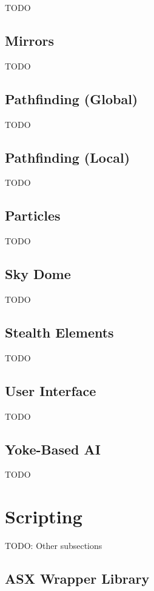 TODO

\subsection{Mirrors}

TODO

\subsection{Pathfinding (Global)}

TODO

\subsection{Pathfinding (Local)}

TODO

\subsection{Particles}

TODO

\subsection{Sky Dome}

TODO

\subsection{Stealth Elements}

TODO

\subsection{User Interface}

TODO

\subsection{Yoke-Based AI}

TODO

\section{Scripting}

TODO: Other subsections

\subsection{ASX Wrapper Library}


